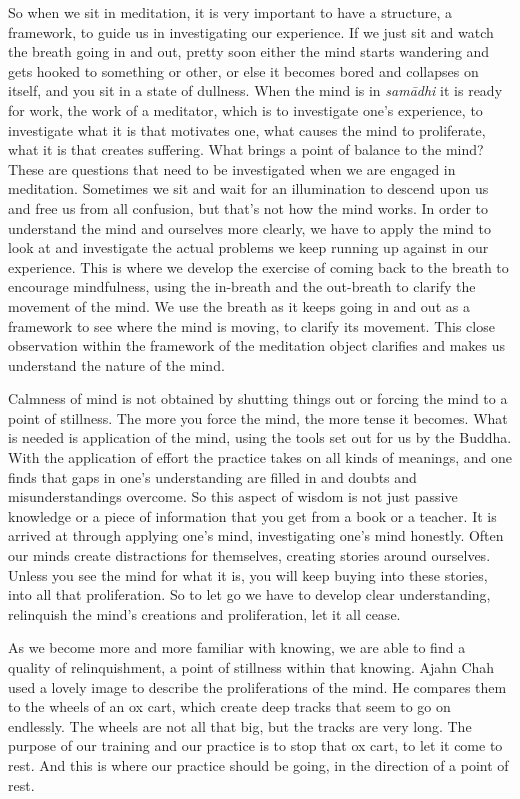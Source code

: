 So when we sit in meditation, it is very important to have a structure, 
a framework, to guide us in investigating our experience. If we just sit
and watch the breath going in and out, pretty soon either the mind
starts wandering and gets hooked to something or other, or else it
becomes bored and collapses on itself, and you sit in a state of
dullness. When the mind is in \emph{samādhi} it is ready for work, the
work of a meditator, which is to investigate one's experience, to
investigate what it is that motivates one, what causes the mind to
proliferate, what it is that creates suffering. What brings a point of
balance to the mind? These are questions that need to be investigated
when we are engaged in meditation. Sometimes we sit and wait for an
illumination to descend upon us and free us from all confusion, but
that's not how the mind works. In order to understand the mind and
ourselves more clearly, we have to apply the mind to look at and
investigate the actual problems we keep running up against in our
experience. This is where we develop the exercise of coming back to the
breath to encourage mindfulness, using the in-breath and the out-breath
to clarify the movement of the mind. We use the breath as it keeps going
in and out as a framework to see where the mind is moving, to clarify
its movement. This close observation within the framework of the
meditation object clarifies and makes us understand the nature of the
mind. 

Calmness of mind is not obtained by shutting things out or forcing the
mind to a point of stillness. The more you force the mind, the more
tense it becomes. What is needed is application of the mind, using the
tools set out for us by the Buddha. With the application of effort the
practice takes on all kinds of meanings, and one finds that gaps in
one's understanding are filled in and doubts and misunderstandings
overcome. So this aspect of wisdom is not just passive knowledge or a
piece of information that you get from a book or a teacher. It is
arrived at through applying one's mind, investigating one's mind
honestly. Often our minds create distractions for themselves, creating
stories around ourselves. Unless you see the mind for what it is, you
will keep buying into these stories, into all that proliferation. So to
let go we have to develop clear understanding, relinquish the mind's
creations and proliferation, let it all cease. 

As we become more and more familiar with knowing, we are able to find a
quality of relinquishment, a point of stillness within that knowing. 
Ajahn Chah used a lovely image to describe the proliferations of the
mind. He compares them to the wheels of an ox cart, which create deep
tracks that seem to go on endlessly. The wheels are not all that big, 
but the tracks are very long. The purpose of our training and our
practice is to stop that ox cart, to let it come to rest. And this is
where our practice should be going, in the direction of a point of rest. 

